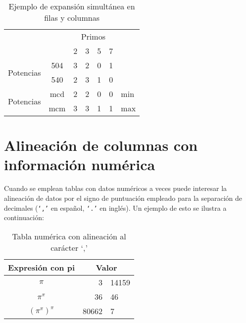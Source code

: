 \documentclass[11pt,a4paper]{article}
\begin{document}
\begin{table}[H]%
	\centering
	\caption{Ejemplo de expansión simultánea en filas y columnas}
	\label{tab:expsimul}
	\begin{tabular}{cc|c|c|c|c|l} %
	\cline{3-6}
	& & \multicolumn{4}{|c|}{Primos} \\ \cline{3-6}
	& & 2 & 3 & 5 & 7 \\ \cline{1-6}
	\multicolumn{1}{|c|}{\multirow{2}{*}{Potencias}} &
	\multicolumn{1}{|c|}{504} & 3 & 2 & 0 & 1 &     \\ \cline{2-6}
	\multicolumn{1}{|c|}{}                        &
	\multicolumn{1}{|c|}{540} & 2 & 3 & 1 & 0 &     \\ \cline{1-6}
	\multicolumn{1}{|c|}{\multirow{2}{*}{Potencias}} &
	\multicolumn{1}{|c|}{mcd} & 2 & 2 & 0 & 0 & min \\ \cline{2-6}
	\multicolumn{1}{|c|}{}                        &
	\multicolumn{1}{|c|}{mcm} & 3 & 3 & 1 & 1 & max \\ \cline{1-6}
	\end{tabular}
\end{table}








\section{Alineación de columnas con información numérica}
Cuando se emplean tablas con datos numéricos a veces puede interesar la alineación de datos por el signo de puntuación empleado para la separación de decimales (\texttt{`,'} en español, \texttt{`.'} en inglés). Un ejemplo de esto se ilustra a continuación:

\begin{table}[H]%
	\centering
	\caption{Tabla numérica con alineación al carácter `,'}
	\label{tab:alineada}
	\begin{tabular}{c r@{,} l}
    \toprule
	Expresión con pi & \multicolumn{2}{c}{Valor} \\
	\midrule
	$\pi$                   &      3 & 14159 \\
	$\pi^{\pi}$             & 36     &    46 \\
	$(\pi^{\pi})^{\pi}$     &  80662 & 7     \\
    \bottomrule
	\end{tabular}
\end{table}
\end{document}
